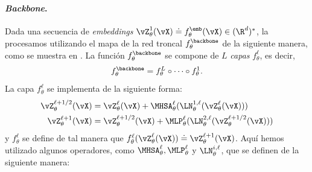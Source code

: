 \documentclass[../../book-main_es.tex]{subfiles}
\begin{document}
\paragraph{\textit{Backbone}.} Dada una secuencia de \textit{embeddings}
\(\vZ_{\theta}^{1}(\vX) \doteq f_{\theta}^{\emb}(\vX) \in
(\R^{d})^{*}\), la procesamos utilizando el mapa de la red troncal
\(f_{\theta}^{\backbone}\) de la siguiente manera, como se muestra en
. La función
\(f_{\theta}^{\backbone}\) se compone de \(L\) \textit{capas}
\(f_{\theta}^{\ell}\), es decir,
\begin{equation}
    f_{\theta}^{\backbone} = f_{\theta}^{L} \circ \cdots \circ f_{\theta}^{1}.
\end{equation}
La capa \(f_{\theta}^{\ell}\) se implementa de la siguiente forma:
\begin{align}\label{eq:vit-res-block}
    \vZ_{\theta}^{\ell + 1/2}(\vX)
    &= \vZ_{\theta}^{\ell}(\vX) +
    \MHSA_{\theta}^{\ell}(\LN_{\theta}^{1, \ell}(\vZ_{\theta}^{\ell}(\vX))) \\
    \vZ_{\theta}^{\ell + 1}(\vX)
    &= \vZ_{\theta}^{\ell + 1/2}(\vX) +
    \MLP_{\theta}^{\ell}(\LN_{\theta}^{2, \ell}(\vZ_{\theta}^{\ell + 1/2}(\vX)))
\end{align}
y \(f_{\theta}^{\ell}\) se define de tal manera que
\(f_{\theta}^{\ell}(\vZ_{\theta}^{\ell}(\vX)) \doteq
\vZ_{\theta}^{\ell + 1}(\vX)\). Aquí hemos utilizado algunos operadores,
como \(\MHSA_{\theta}^{\ell}, \MLP_{\theta}^{\ell}\) y
\(\LN_{\theta}^{i, \ell}\), que se definen de la siguiente manera:
\end{document}
